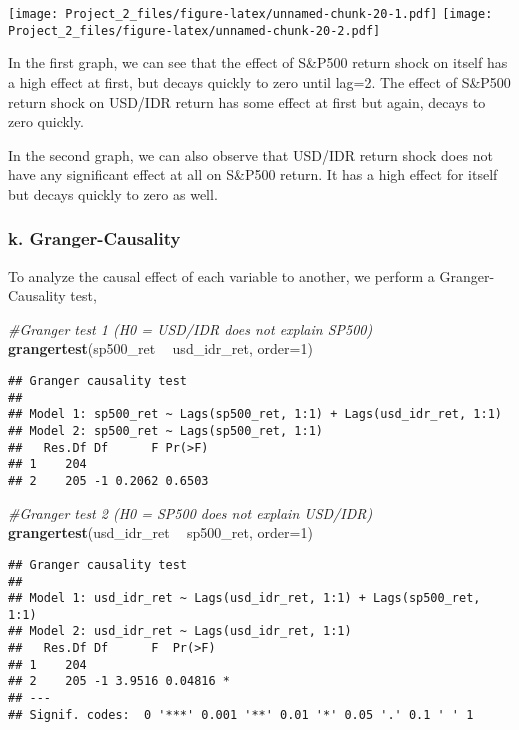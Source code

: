 \documentclass[]{article}
\newenvironment{Shaded}{\begin{snugshade}}{\end{snugshade}}
\newcommand{\KeywordTok}[1]{\textcolor[rgb]{0.13,0.29,0.53}{\textbf{#1}}}
\newcommand{\DataTypeTok}[1]{\textcolor[rgb]{0.13,0.29,0.53}{#1}}
\newcommand{\DecValTok}[1]{\textcolor[rgb]{0.00,0.00,0.81}{#1}}
\newcommand{\StringTok}[1]{\textcolor[rgb]{0.31,0.60,0.02}{#1}}
\newcommand{\CommentTok}[1]{\textcolor[rgb]{0.56,0.35,0.01}{\textit{#1}}}
\newcommand{\OperatorTok}[1]{\textcolor[rgb]{0.81,0.36,0.00}{\textbf{#1}}}
\newcommand{\NormalTok}[1]{#1}
\begin{document}
\texttt{[image: Project\_2\_files/figure-latex/unnamed-chunk-20-1.pdf]}
\texttt{[image: Project\_2\_files/figure-latex/unnamed-chunk-20-2.pdf]}

In the first graph, we can see that the effect of S\&P500 return shock
on itself has a high effect at first, but decays quickly to zero until
lag=2. The effect of S\&P500 return shock on USD/IDR return has some
effect at first but again, decays to zero quickly.

In the second graph, we can also observe that USD/IDR return shock does
not have any significant effect at all on S\&P500 return. It has a high
effect for itself but decays quickly to zero as well.

\subsubsection{k. Granger-Causality}\label{k.-granger-causality}

To analyze the causal effect of each variable to another, we perform a
Granger-Causality test,

\begin{Shaded}
\begin{Highlighting}[]
\CommentTok{#Granger test 1 (H0 = USD/IDR does not explain SP500)}
\KeywordTok{grangertest}\NormalTok{(sp500_ret }\OperatorTok{~}\StringTok{ }\NormalTok{usd_idr_ret, }\DataTypeTok{order=}\DecValTok{1}\NormalTok{)}
\end{Highlighting}
\end{Shaded}

\begin{verbatim}
## Granger causality test
## 
## Model 1: sp500_ret ~ Lags(sp500_ret, 1:1) + Lags(usd_idr_ret, 1:1)
## Model 2: sp500_ret ~ Lags(sp500_ret, 1:1)
##   Res.Df Df      F Pr(>F)
## 1    204                 
## 2    205 -1 0.2062 0.6503
\end{verbatim}

\begin{Shaded}
\begin{Highlighting}[]
\CommentTok{#Granger test 2 (H0 = SP500 does not explain USD/IDR)}
\KeywordTok{grangertest}\NormalTok{(usd_idr_ret }\OperatorTok{~}\StringTok{ }\NormalTok{sp500_ret, }\DataTypeTok{order=}\DecValTok{1}\NormalTok{)}
\end{Highlighting}
\end{Shaded}

\begin{verbatim}
## Granger causality test
## 
## Model 1: usd_idr_ret ~ Lags(usd_idr_ret, 1:1) + Lags(sp500_ret, 1:1)
## Model 2: usd_idr_ret ~ Lags(usd_idr_ret, 1:1)
##   Res.Df Df      F  Pr(>F)  
## 1    204                    
## 2    205 -1 3.9516 0.04816 *
## ---
## Signif. codes:  0 '***' 0.001 '**' 0.01 '*' 0.05 '.' 0.1 ' ' 1
\end{verbatim}
\end{document}
